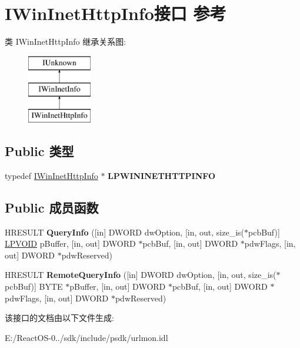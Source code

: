 \hypertarget{interface_i_win_inet_http_info}{}\section{I\+Win\+Inet\+Http\+Info接口 参考}
\label{interface_i_win_inet_http_info}
类 I\+Win\+Inet\+Http\+Info 继承关系图\+:\begin{figure}[H]
\begin{center}
\leavevmode
\includegraphics[height=3.000000cm]{interface_i_win_inet_http_info}
\end{center}
\end{figure}
\subsection*{Public 类型}
\begin{DoxyCompactItemize}
\item 
\mbox{\label{interface_i_win_inet_http_info_af066e36a84e55e89174ca0982ea32580}} 
typedef \hyperlink{interface_i_win_inet_http_info}{I\+Win\+Inet\+Http\+Info} $\ast$ {\bfseries L\+P\+W\+I\+N\+I\+N\+E\+T\+H\+T\+T\+P\+I\+N\+FO}
\end{DoxyCompactItemize}
\subsection*{Public 成员函数}
\begin{DoxyCompactItemize}
\item 
\mbox{\label{interface_i_win_inet_http_info_a739a78ccac4341081f898b073a6a90fd}} 
H\+R\+E\+S\+U\+LT {\bfseries Query\+Info} (\mbox{[}in\mbox{]} D\+W\+O\+RD dw\+Option, \mbox{[}in, out, size\+\_\+is($\ast$pcb\+Buf)\mbox{]} \hyperlink{interfacevoid}{L\+P\+V\+O\+ID} p\+Buffer, \mbox{[}in, out\mbox{]} D\+W\+O\+RD $\ast$pcb\+Buf, \mbox{[}in, out\mbox{]} D\+W\+O\+RD $\ast$pdw\+Flags, \mbox{[}in, out\mbox{]} D\+W\+O\+RD $\ast$pdw\+Reserved)
\item 
\mbox{\label{interface_i_win_inet_http_info_ac7f29466eb645a250879b96aadff4fcd}} 
H\+R\+E\+S\+U\+LT {\bfseries Remote\+Query\+Info} (\mbox{[}in\mbox{]} D\+W\+O\+RD dw\+Option, \mbox{[}in, out, size\+\_\+is($\ast$pcb\+Buf)\mbox{]} B\+Y\+TE $\ast$p\+Buffer, \mbox{[}in, out\mbox{]} D\+W\+O\+RD $\ast$pcb\+Buf, \mbox{[}in, out\mbox{]} D\+W\+O\+RD $\ast$pdw\+Flags, \mbox{[}in, out\mbox{]} D\+W\+O\+RD $\ast$pdw\+Reserved)
\end{DoxyCompactItemize}


该接口的文档由以下文件生成\+:\begin{DoxyCompactItemize}
\item 
E\+:/\+React\+O\+S-\/0../sdk/include/psdk/urlmon.\+idl\end{DoxyCompactItemize}
